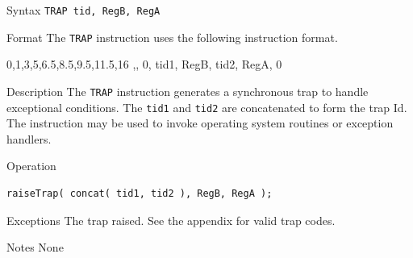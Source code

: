 %
%
\pagebreak
{}

\begin{iPageDescEntry}{Syntax}
\texttt{TRAP tid, RegB, RegA}
\end{iPageDescEntry}

\begin{iPageDescEntry}{Format}
The \texttt{TRAP} instruction uses the following instruction format. \\

\begin{flushleft}
\drawInstrFormat
    {0,1,3,5,6.5,8.5,9.5,11.5,16}
    {\OpCodeGrpSYS,\OpCodeTRAP, 0, tid1, RegB, tid2, RegA, 0}
\end{flushleft}
\end{iPageDescEntry}

\begin{iPageDescEntry}{Description}
The \texttt{TRAP} instruction generates a synchronous trap to handle exceptional conditions.  The \texttt{tid1} and \texttt{tid2} are concatenated to form the trap Id. The instruction may be used to invoke operating system routines or exception handlers.
\end{iPageDescEntry}

\begin{iPageDescOpEntry}{Operation}
\begin{lstlisting}[style=iPageOpStyle]
raiseTrap( concat( tid1, tid2 ), RegB, RegA );
\end{lstlisting}
\end{iPageDescOpEntry}

\begin{iPageDescEntry}{Exceptions}
The trap raised. See the appendix for valid trap codes.
\end{iPageDescEntry}

\begin{iPageDescEntry}{Notes}
None
\end{iPageDescEntry}
